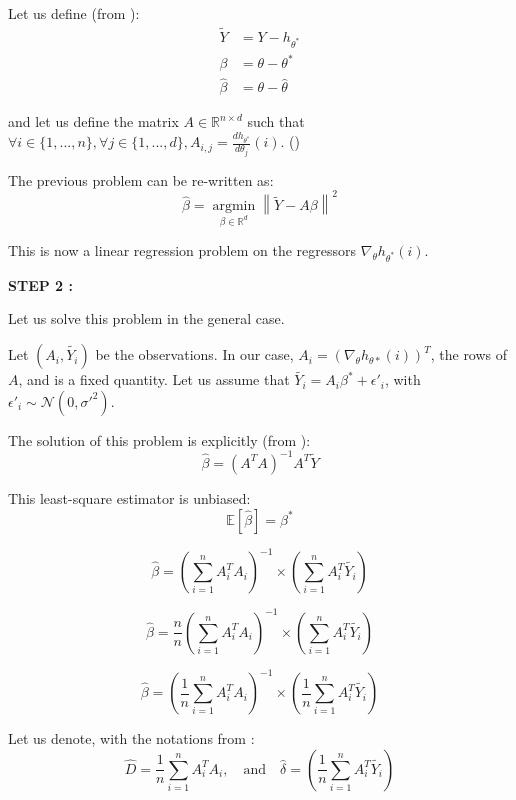 Let us define (from \cite{ruckstuhl2010introduction}): \\
\begin{align*}
\tilde{Y} &= Y - h_{\theta^*} \\
\beta &= \theta - \theta^* \\
\hat{\beta} &= \theta - \hat{\theta}
\end{align*}

and let us define the matrix $A \in \mathbb{R} ^{n \times d }$ such that $\forall i \in \{ 1, ..., n\}, \forall j \in \{1, ..., d\}, A_{i, j} = \frac{dh_{\theta^*}}{d\theta_j}(i)$.
(\cite{ruckstuhl2010introduction})

The previous problem can be re-written as:
\[
\hat{\beta} =  \underset{\beta \in \mathbb{R}^d}{\operatorname{argmin}}  \left\lVert \tilde{Y} - A \beta \right\rVert ^2
\]

This is now a  linear regression problem on the regressors $\nabla_\theta h_{\theta^*}(i)$.



\textbf{STEP 2 :}\\
\label{step:step2}



Let us solve this problem in the general case.

Let $(A_i, \tilde{Y_i})$ be the observations.
In our case, $A_i = (\nabla_\theta h_{\theta*} (i))^T$, the rows of $A$,  and is a fixed quantity.  
Let us assume that $\tilde{Y_i} = A_i \beta ^* + \epsilon'_i $, with $\epsilon'_i \sim \mathcal{N}(0, \sigma'^2)$.

The solution of this problem is explicitly (from \cite*{powellasymptoticsforleastsquares}):
\[
\hat{\beta } = (A^T A) ^{-1} A^T \tilde{Y}
\]

This least-square estimator is unbiased:
\[
\mathbb{E}[\hat{\beta}] = \beta^*
\]


\[
\hat {\beta } = \left(\sum_{i=1}^{n}   A_i ^T A_i \right) ^{-1}    \times \left(\sum_{i=1}^{n} A_i ^T \tilde{Y_i } \right)
\]

\[
\hat {\beta } =\frac{n}{n} \left(\sum_{i=1}^{n}   A_i ^T A_i \right) ^{-1}    \times \left(\sum_{i=1}^{n} A_i ^T \tilde{Y_i } \right)
\]

\[
\hat {\beta } = \left(\frac{1}{n} \sum_{i=1}^{n}   A_i ^T A_i \right) ^{-1}    \times \left(\frac{1}{n} \sum_{i=1}^{n} A_i ^T \tilde{Y_i } \right)
\]

Let us denote, with the notations from \cite{powellasymptoticsforleastsquares}:
\[
\hat{D}  = \frac{1}{n} \sum_{i=1}^{n}   A_i ^T A_i , \quad \text{and} \quad \hat{\delta}  = \left(\frac{1}{n} \sum_{i=1}^{n} A_i ^T \tilde{Y_i } \right)
\]

